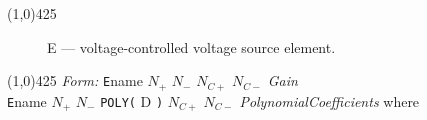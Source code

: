 
\oddsidemargin 10mm \topmargin 0.0in \textwidth 5.5in \textheight 7.375in
\evensidemargin 1.0in \headheight 0.18in \footskip 0.16in
%
\section[E \- Voltage-Controlled Voltage Source]{}
\linethickness{1mm}
\line(1,0){425}
\normalsize
\begin{figure}[h]
\centerline{\epsfxsize=3in} \caption{E ---
voltage-controlled voltage source element.}
\end{figure}
\linethickness{0.5mm} \line(1,0){425}
\newline
\textit{Form:}
\newline
{\tt E}name $N_{+}$ $N_{-}$ $N_{C+}$ $N_{C-}$ {\it Gain}\\
{\tt E}name $N_{+}$ $N_{-}$ {\tt POLY(} D {\tt )} $N_{C+}$
$N_{C-}$ {\it PolynomialCoefficients}
\newline
where
\newline
